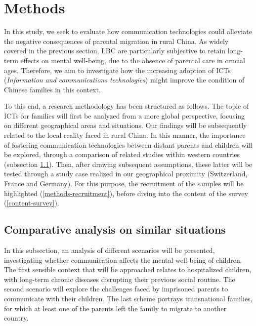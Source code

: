 \section{Methods}
\label{sec:methods}

In this study, we seek to evaluate how communication technologies could alleviate the negative consequences of parental migration in rural China. As widely covered in the previous section, LBC are particularly subjective to retain long-term effects on mental well-being, due to the absence of parental care in crucial ages. Therefore, we aim to investigate how the increasing adoption of ICTs (\textit{Information and communications technologies}) might improve the condition of Chinese families in this context.

To this end, a research methodology has been structured as follows. The topic of ICTs for families will first be analyzed from a more global perspective, focusing on different geographical areas and situations. Our findings will be subsequently related to the local reality faced in rural China. In this manner, the importance of fostering communication technologies between distant parents and children will be explored, through a comparison of related studies within western countries (subsection \ref{methods-compare}). Then, after drawing subsequent assumptions, these latter will be tested through a study case realized in our geographical proximity (Switzerland, France and Germany). For this purpose, the recruitment of the samples will be highlighted (\ref{methods-recruitment}), before diving into the content of the survey (\ref{content-survey}).

\subsection{Comparative analysis on similar situations}
\label{methods-compare}

In this subsection, an analysis of different scenarios will be presented, investigating whether communication affects the mental well-being of children. The first sensible context that will be approached relates to hospitalized children, with long-term chronic diseases disrupting their previous social routine. The second scenario will explore the challenges faced by imprisoned parents to communicate with their children. The last scheme portrays transnational families, for which at least one of the parents left the family to migrate to another country. 

\vspace{4pt}
